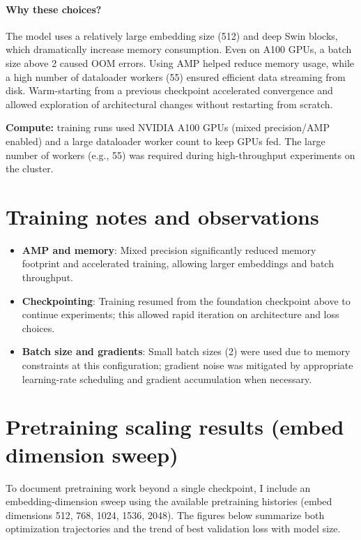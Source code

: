 \documentclass[12pt]{report}
\begin{document}
\paragraph{Why these choices?}
The model uses a relatively large embedding size (512) and deep Swin blocks, which dramatically increase memory consumption. Even on A100 GPUs, a batch size above 2 caused OOM errors. Using AMP helped reduce memory usage, while a high number of dataloader workers (55) ensured efficient data streaming from disk. Warm-starting from a previous checkpoint accelerated convergence and allowed exploration of architectural changes without restarting from scratch.

\noindent\textbf{Compute:} training runs used NVIDIA A100 GPUs (mixed precision/AMP enabled) and a large dataloader worker count to keep GPUs fed. The large number of workers (e.g., 55) was required during high-throughput experiments on the cluster.

\section{Training notes and observations}
\begin{itemize}
  \item \textbf{AMP and memory}: Mixed precision significantly reduced memory footprint and accelerated training, allowing larger embeddings and batch throughput.
  \item \textbf{Checkpointing}: Training resumed from the foundation checkpoint above to continue experiments; this allowed rapid iteration on architecture and loss choices.
  \item \textbf{Batch size and gradients}: Small batch sizes (2) were used due to memory constraints at this configuration; gradient noise was mitigated by appropriate learning-rate scheduling and gradient accumulation when necessary.
\end{itemize}

\section{Pretraining scaling results (embed dimension sweep)}

To document pretraining work beyond a single checkpoint, I include an embedding-dimension sweep using the available pretraining histories (embed dimensions 512, 768, 1024, 1536, 2048). The figures below summarize both optimization trajectories and the trend of best validation loss with model size.
\end{document}

